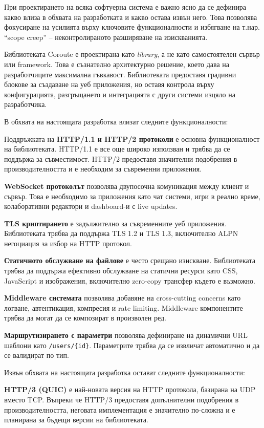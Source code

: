 При проектирането на всяка софтуерна система е важно ясно да се дефинира какво влиза в обхвата на разработката и какво остава извън него. Това позволява фокусиране на усилията върху ключовите функционалности и избягване на т.нар. ``scope creep'' -- неконтролираното разширяване на изискванията.

Библиотеката Coroute е проектирана като \textit{library}, а не като самостоятелен сървър или framework. Това е съзнателно архитектурно решение, което дава на разработчиците максимална гъвкавост. Библиотеката предоставя градивни блокове за създаване на уеб приложения, но оставя контрола върху конфигурацията, разгръщането и интеграцията с други системи изцяло на разработчика.

В обхвата на настоящата разработка влизат следните функционалности:

Поддръжката на \textbf{HTTP/1.1 и HTTP/2 протоколи} е основна функционалност на библиотеката. HTTP/1.1 е все още широко използван и трябва да се поддържа за съвместимост. HTTP/2 предоставя значителни подобрения в производителността и е необходим за съвременни приложения.

\textbf{WebSocket протоколът} позволява двупосочна комуникация между клиент и сървър. Това е необходимо за приложения като чат системи, игри в реално време, колаборативни редактори и dashboard-и с live updates.

\textbf{TLS криптирането} е задължително за съвременните уеб приложения. Библиотеката трябва да поддържа TLS 1.2 и TLS 1.3, включително ALPN негоциация за избор на HTTP протокол.

\textbf{Статичното обслужване на файлове} е често срещано изискване. Библиотеката трябва да поддържа ефективно обслужване на статични ресурси като CSS, JavaScript и изображения, включително zero-copy трансфер където е възможно.

\textbf{Middleware системата} позволява добавяне на cross-cutting concerns като логване, автентикация, компресия и rate limiting. Middleware компонентите трябва да могат да се композират в произволен ред.

\textbf{Маршрутизирането с параметри} позволява дефиниране на динамични URL шаблони като \texttt{/users/\{id\}}. Параметрите трябва да се извличат автоматично и да се валидират по тип.

Извън обхвата на настоящата разработка остават следните функционалности:

\textbf{HTTP/3 (QUIC)} е най-новата версия на HTTP протокола, базирана на UDP вместо TCP. Въпреки че HTTP/3 предоставя допълнителни подобрения в производителността, неговата имплементация е значително по-сложна и е планирана за бъдещи версии на библиотеката.

